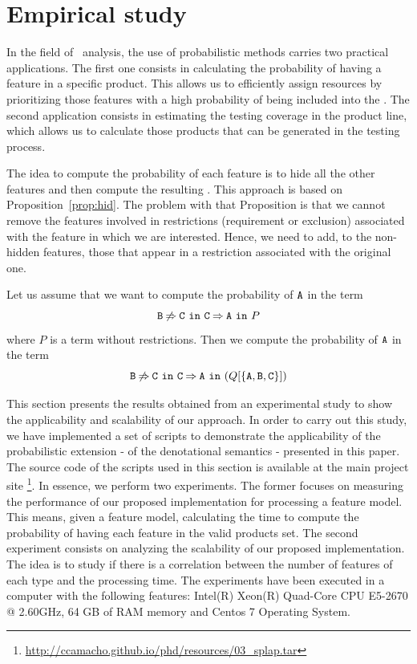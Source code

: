 
\section{Empirical study}
\label{sec:stat:impl}

In the field of \SPLs\ analysis, the use of probabilistic methods carries two practical applications.
The first one consists in calculating the probability of having a
feature in a specific product.
This allows us to efficiently assign resources by prioritizing those features with a high probability
of being included into the \SPL. The second application consists in estimating the testing coverage
in the product line, which allows us to calculate those products that can be generated in the testing process.

The idea to compute the probability of each feature is to hide all the
other features and then compute the resulting \SPL. This approach is
based on Proposition~\ref{prop:hid}. The problem with that Proposition
is that we cannot remove the features involved in restrictions
(requirement or exclusion) associated with the feature in which we are
interested. Hence, we need to add, to the non-hidden features, those that
appear in a restriction associated with the original one.
\begin{example}
  Let us assume that we want to compute the probability of ${\mathtt{A}}$ in
  the term
  \begin{displaymath}
    \mathtt{B}\mathbin{\not\Rightarrow}\mathtt{C}\ \mathtt{in}\ \mathtt{C}\mathbin{\Rightarrow}\mathtt{A}\ \mathtt{in}\ P
    \end{displaymath}
    where \(P\) is a term without restrictions. Then we compute the
    probability of ${\mathtt{A}}$ in the term
  \begin{displaymath}
    \mathtt{B}\mathbin{\not\Rightarrow}\mathtt{C}\ \mathtt{in}\ \mathtt{C}\mathbin{\Rightarrow}\mathtt{A}\ \mathtt{in}\ (Q[\{{\mathtt{A}}, {\mathtt{B}}, {\mathtt{C}}\}])
    \end{displaymath}

\end{example}

This section presents the results obtained from an experimental study to show the applicability and scalability of our
approach. In order to carry out this study, we have implemented a set of scripts to demonstrate
the applicability of the
probabilistic extension - of the denotational semantics - presented in this paper. The source code of the
scripts used in this section is available at the main project site
\footnote{\url{http://ccamacho.github.io/phd/resources/03_splap.tar}}. In essence, we perform two experiments.
The former focuses on measuring the performance of our proposed implementation for processing a feature model.
This means, given a feature model, calculating the time to
compute the probability of having each feature in the
valid products set.
The second experiment consists on analyzing the scalability of our proposed implementation.
The idea is to study if there is a correlation between the number of features of each type and the
processing time. The experiments have been executed in a computer with the following features: Intel(R)
Xeon(R) Quad-Core CPU E5-2670 @ 2.60GHz, 64 GB of RAM memory and Centos 7 Operating System.

